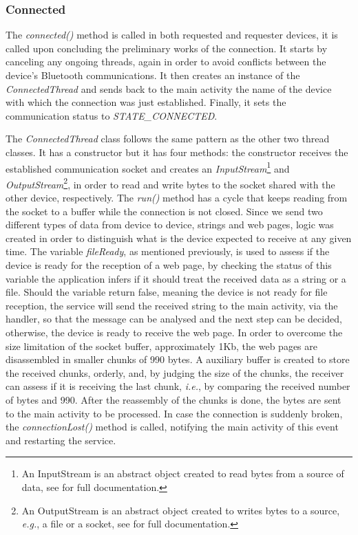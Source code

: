 \subsubsection{Connected}
\label{subsubsec:connected}

The \textit{connected()} method is called in both requested and requester devices, it is called upon concluding the preliminary works of the connection. It starts by canceling any ongoing threads, again in order to avoid conflicts between the device's Bluetooth communications. It then creates an instance of the \textit{ConnectedThread} and sends back to the main activity the name of the device with which the connection was just established. Finally, it sets the communication status to \textit{STATE\_CONNECTED}.

The \textit{ConnectedThread} class follows the same pattern as the other two thread classes. It has a constructor but it has four methods: the constructor receives the established communication socket and creates an \textit{InputStream}\footnote{An InputStream is an abstract object created to read bytes from a source of data, see \cite{inputStream} for full documentation.} and \textit{OutputStream}\footnote{An OutputStream is an abstract object created to writes bytes to a source, \textit{e.g.}, a file or a socket, see \cite{outputStream} for full documentation.}, in order to read and write bytes to the socket shared with the other device, respectively. The \textit{run()} method has a cycle that keeps reading from the socket to a buffer while the connection is not closed. Since we send two different types of data from device to device, strings and web pages, logic was created in order to distinguish what is the device expected to receive at any given time. The variable \textit{fileReady}, as mentioned previously, is used to assess if the device is ready for the reception of a web page, by checking the status of this variable the application infers if it should treat the received data as a string or a file. Should the variable return false, meaning the device is not ready for file reception, the service will send the received string to the main activity, via the handler, so that the message can be analysed and the next step can be decided, otherwise, the device is ready to receive the web page. In order to overcome the size limitation of the socket buffer, approximately 1Kb, the web pages are disassembled in smaller chunks of 990 bytes. A auxiliary buffer is created to store the received chunks, orderly, and, by judging the size of the chunks, the receiver can assess if it is receiving the last chunk, \textit{i.e.}, by comparing the received number of bytes and 990. After the reassembly of the chunks is done, the bytes are sent to the main activity to be processed. In case the connection is suddenly broken, the \textit{connectionLost()} method is called, notifying the main activity of this event and restarting the service.

